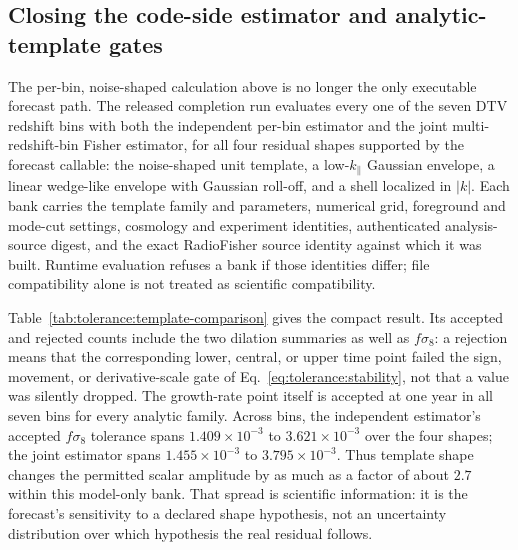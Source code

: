 \subsection*{Closing the code-side estimator and analytic-template gates}

The per-bin, noise-shaped calculation above is no longer the only executable
forecast path.  The released completion run evaluates every one of the seven
DTV redshift bins with both the independent per-bin estimator and the joint
multi-redshift-bin Fisher estimator, for all four residual shapes supported by
the forecast callable: the noise-shaped unit template, a low-$k_\parallel$
Gaussian envelope, a linear wedge-like envelope with Gaussian roll-off, and a
shell localized in $|k|$.  Each bank carries the template family and
parameters, numerical grid, foreground and mode-cut settings, cosmology and
experiment identities, authenticated analysis-source digest, and the exact
RadioFisher source identity against which it was built.  Runtime evaluation
refuses a bank if those identities differ; file compatibility alone is not
treated as scientific compatibility.

Table~\ref{tab:tolerance:template-comparison} gives the compact result.  Its accepted
and rejected counts include the two dilation summaries as well as
$f\sigma_8$: a rejection means that the corresponding lower, central, or upper
time point failed the sign, movement, or derivative-scale gate of
Eq.~\eqref{eq:tolerance:stability}, not that a value was silently dropped.  The
growth-rate point itself is accepted at one year in all seven bins for every
analytic family.  Across bins, the independent estimator's accepted
$f\sigma_8$ tolerance spans $1.409\times10^{-3}$ to
$3.621\times10^{-3}$ over the four shapes; the joint estimator spans
$1.455\times10^{-3}$ to $3.795\times10^{-3}$.  Thus template shape changes the
permitted scalar amplitude by as much as a factor of about $2.7$ within this
model-only bank.  That spread is scientific information: it is the forecast's
sensitivity to a declared shape hypothesis, not an uncertainty distribution
over which hypothesis the real residual follows.

